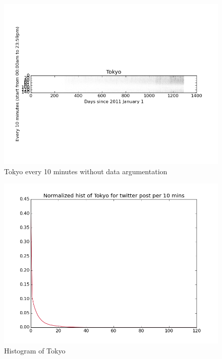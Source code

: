 \documentclass[a4paper,12pt]{article}
\begin{document}
 


  \begin{figure}[H]
  \begin{center}
      \includegraphics[scale=0.8]{1Tokyo.png}
\end{center}
\caption{Tokyo every 10 minutes without data argumentation}
 \label {fig:2}
 \end{figure}
 
 
   \begin{figure}[H]
  \begin{center}
      \includegraphics[scale=0.8]{1Tokyohisto.png}
\end{center}
\caption{Histogram of Tokyo}
 \label {fig:2}
 \end{figure}
 
\end{document}
